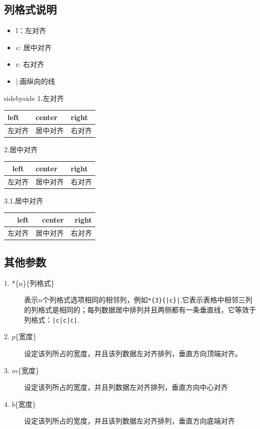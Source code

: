 \documentclass[cn,chinese,color=cyan]{elegantbook}
\begin{document}
\subsection{列格式说明}
\begin{itemize}
	\item l：左对齐
	\item c: 居中对齐
	\item r: 右对齐
	\item |:画纵向的线
\end{itemize}
\begin{tcblisting}{sidebyside}
1.左对齐\par
\begin{tabular}{|l|l|l|}\hline
\bfseries left &\bfseries center &\bfseries right\\ \hline
左对齐&居中对齐&右对齐\\ \hline
\end{tabular}\par
2.居中对齐\par
\begin{tabular}{|c|l|l|}\hline
\bfseries left &\bfseries center &\bfseries right\\ \hline
左对齐&居中对齐&右对齐\\ \hline
\end{tabular}\par
3.1.居中对齐\par
\begin{tabular}{|r|r|r|}\hline %
\bfseries left &\bfseries center &\bfseries right\\ \hline
左对齐&居中对齐&右对齐\\ \hline
\end{tabular}
\end{tcblisting}
\subsection{其他参数}
\begin{description}
	\item[1. *\{n\}\{列格式\} ] 表示$n$个列格式选项相同的相邻列，例如\verb+*{3}{|c}|+,它表示表格中相邻三列的列格式是相同的；每列数据居中排列并且两侧都有一条垂直线，它等效于列格式：\verb+|c|c|c|+.
	\item[2. $p$\{宽度\}] 设定该列所占的宽度，并且该列数据左对齐排列，垂直方向顶端对齐。
	\item[3. $m$\{宽度\}] 设定该列所占的宽度，并且列数据左对齐排列，垂直方向中心对齐
	\item[4. $b$\{宽度\}] 设定该列所占的宽度，并且该列数据左对齐排列，垂直方向底端对齐
\end{description}
\end{document}

